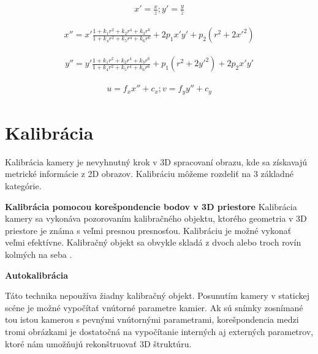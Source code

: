 \begin{equation}
\label{eq::real_camera::b}
\begin{aligned}
x'= \frac{x}{z}; y'= \frac{y}{z}
\end{aligned}
\end{equation}

\begin{equation}
\label{eq::real_camera::d}
\begin{aligned}
x''= x' \frac{1 + k_{1}r^{2} + k_{2}r^{4} + k_{3}r^{6}}{1 + k_{4}r^{2} + k_{5}r^{4} + k_{6}r^{6}} + 2p_{1}x'y' + p_{2}\left(r^{2} + 2x'^{2}\right)
\end{aligned}
\end{equation}

\begin{equation}
\label{eq::real_camera::e}
\begin{aligned}
y''= y' \frac{1 + k_{1}r^{2} + k_{2}r^{4} + k_{3}r^{6}}{1 + k_{4}r^{2} + k_{5}r^{4} + k_{6}r^{6}} + p_{1}\left(r^{2} + 2y'^{2}\right) + 2p_{2}x'y'
\end{aligned}
\end{equation}


\begin{equation}
\label{eq::tangential_dist::f}
\begin{aligned}
u = f_{x} x'' + c_{x}; v = f_{y} y'' + c_{y}
\end{aligned}
\end{equation}


\section{Kalibrácia}

Kalibrácia kamery je nevyhnutný krok v 3D spracovaní obrazu, kde sa získavajú metrické informácie z 2D obrazov. Kalibráciu môžeme rozdeliť na 3 základné kategórie.

\textbf{Kalibrácia pomocou korešpondencie bodov v 3D priestore}\newline
Kalibrácia kamery sa vykonáva pozorovaním kalibračného objektu, ktorého geometria v 3D priestore je známa s veľmi presnou presnosťou. Kalibráciu je možné vykonať veľmi efektívne. Kalibračný objekt sa obvykle skladá z dvoch alebo troch rovín kolmých na seba \cite{faugeras1993three}.

\textbf{Autokalibrácia} 

Táto technika nepoužíva žiadny kalibračný objekt. Posunutím kamery v statickej scéne je možné vypočítať vnútorné parametre kamier. Ak sú snímky zosnímané tou istou kamerou s pevnými vnútornými parametrami, korešpondencia medzi tromi obrázkami je dostatočná na vypočítanie interných aj externých parametrov, ktoré nám umožňujú rekonštruovať 3D štruktúru. 

